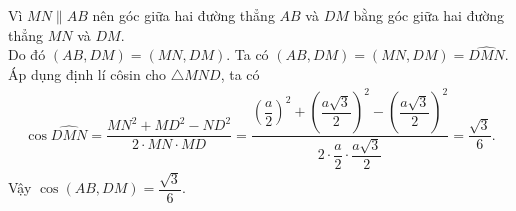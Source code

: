 \begin{ex}
{\begin{itemchoice}
			\itemch Vì $MN \parallel AB$ nên góc giữa hai đường thẳng $AB$ và $DM$ bằng góc giữa hai đường thẳng $MN$ và $DM$.  \\
			Do đó $\left(AB,  DM\right) = \left(MN, DM\right)$.
			\itemch Ta có $\left(AB, DM\right)  = \left(MN, DM\right)=\widehat{DMN}$. \\
			Áp  dụng định lí côsin cho $\triangle MND$, ta có
			\allowdisplaybreaks 
			\begin{eqnarray*}
				\cos\widehat{DMN} = \dfrac{MN^2 + MD^2 - ND^2}{2\cdot MN  \cdot MD} = \dfrac{\left(\dfrac{a}{2}\right)^2 + \left(\dfrac{a\sqrt{3}}{2}\right)^2 - \left(\dfrac{a\sqrt{3}}{2}\right)^2}{2\cdot\dfrac{a}{2}\cdot\dfrac{a\sqrt{3}}{2}}= \dfrac{\sqrt{3}}{6}.
			\end{eqnarray*}
			Vậy  $\cos\left(AB, DM\right) = \dfrac{\sqrt{3}}{6}$.
		\end{itemchoice}
	 }
\end{ex}

